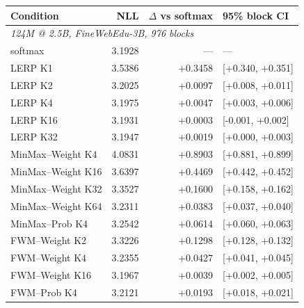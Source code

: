\begin{tabular}{lrrl}
\toprule
Condition & NLL & $\Delta$ vs softmax & 95\% block CI \\
\midrule
\multicolumn{4}{l}{\emph{124M @ 2.5B, FineWebEdu-3B, 976 blocks}} \\
softmax & 3.1928 & --- & --- \\
LERP K1 & 3.5386 & +0.3458 & [+0.340, +0.351] \\
LERP K2 & 3.2025 & +0.0097 & [+0.008, +0.011] \\
LERP K4 & 3.1975 & +0.0047 & [+0.003, +0.006] \\
LERP K16 & 3.1931 & +0.0003 & [-0.001, +0.002] \\
LERP K32 & 3.1947 & +0.0019 & [+0.000, +0.003] \\
MinMax--Weight K4 & 4.0831 & +0.8903 & [+0.881, +0.899] \\
MinMax--Weight K16 & 3.6397 & +0.4469 & [+0.442, +0.452] \\
MinMax--Weight K32 & 3.3527 & +0.1600 & [+0.158, +0.162] \\
MinMax--Weight K64 & 3.2311 & +0.0383 & [+0.037, +0.040] \\
MinMax--Prob K4 & 3.2542 & +0.0614 & [+0.060, +0.063] \\
FWM--Weight K2 & 3.3226 & +0.1298 & [+0.128, +0.132] \\
FWM--Weight K4 & 3.2355 & +0.0427 & [+0.041, +0.045] \\
FWM--Weight K16 & 3.1967 & +0.0039 & [+0.002, +0.005] \\
FWM--Prob K4 & 3.2121 & +0.0193 & [+0.018, +0.021] \\
\bottomrule
\end{tabular}
